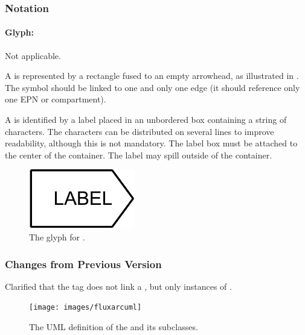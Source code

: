 \subsubsection{Notation}

\paragraph{Glyph: }
\label{sec:techref:tag}

\begin{glyphDescription}

\glyphSboTerm Not applicable.

\glyphContainer A  is represented by a rectangle fused to an empty arrowhead, as illustrated in .  The symbol should be linked to one and only one edge (\ie it should reference only one EPN or compartment).

\glyphLabel A  is identified by a label placed in an unbordered box containing a string of characters.  The characters can be distributed on several lines to improve readability, although this is not mandatory.  The label box must be attached to the center of the container. The label may spill outside of the container.

\end{glyphDescription}

\begin{figure}[htb]
  \centering
  \includegraphics[scale = 0.3]{images/tag}
  \caption{The \PD glyph for .}
  \label{fig:techref:tag}
\end{figure}

\subsubsection{Changes from Previous Version}

Clarified that the tag does not link a , but
only instances of .

\label{defn:FluxArc}

\begin{figure}[htb]
  \centering
  \texttt{[image: images/fluxarcuml]}
  \caption{The UML definition of the  and its subclasses.}
  \label{fig:techref:fluxarcuml}
\end{figure}

